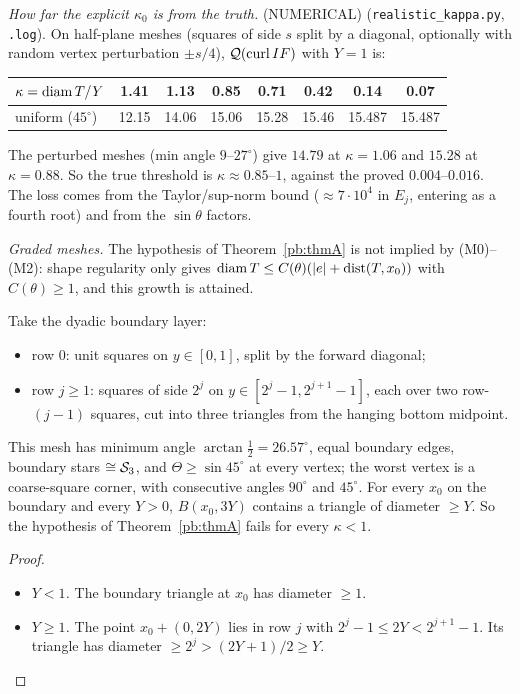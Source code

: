 \emph{How far the explicit $\kappa_0$ is from the truth.} (NUMERICAL) (\texttt{realistic\_kappa.py}, \texttt{.log}). On half-plane meshes (squares of side $s$ split by a
diagonal, optionally with random vertex perturbation $\pm s/4$), $\mathcal Q(\operatorname{curl} IF)$ with $Y=1$ is:
\begin{center}\small\begin{tabular}{lccccccc}
\toprule
$\kappa=\operatorname{diam} T/Y$ & 1.41 & 1.13 & 0.85 & 0.71 & 0.42 & 0.14 & 0.07\\
\midrule
uniform ($45^\circ$) & 12.15 & 14.06 & 15.06 & 15.28 & 15.46 & 15.487 & 15.487\\
\bottomrule
\end{tabular}\end{center}
The perturbed meshes (min angle $9$--$27^\circ$) give $14.79$ at $\kappa=1.06$ and $15.28$ at $\kappa=0.88$. So the true
threshold is $\kappa\approx0.85$--$1$, against the proved $0.004$--$0.016$. The loss comes from the Taylor/sup-norm bound
($\approx7\cdot10^4$ in $E_j$, entering as a fourth root) and from the $\sin\theta$ factors.


\emph{Graded meshes.} The hypothesis of Theorem~\ref{pb:thmA} is not implied by (M0)--(M2): shape regularity only gives $\operatorname{diam} T\le C(\theta)(|e|+\operatorname{dist}(T,x_0))$ with $C(\theta)\ge1$, and this growth is attained.

\begin{proposition}\label{pb:obst}
Take the dyadic boundary layer:
\begin{itemize}
\item row 0: unit squares on $y\in[0,1]$, split by the forward diagonal;
\item row $j\ge1$: squares of side $2^j$ on $y\in[2^j-1,2^{j+1}-1]$, each over two row-$(j-1)$ squares, cut into three
triangles from the hanging bottom midpoint.
\end{itemize}
This mesh has minimum angle $\arctan\frac12=26.57^\circ$, equal boundary edges, boundary stars $\cong\mathcal S_3$, and
$\Theta\ge\sin45^\circ$ at every vertex; the worst vertex is a coarse-square corner, with consecutive angles $90^\circ$ and
$45^\circ$. For every $x_0$ on the boundary and every $Y>0$, $B(x_0,3Y)$ contains a triangle of diameter $\ge Y$. So the hypothesis of Theorem~\ref{pb:thmA} fails for every $\kappa<1$.
\end{proposition}
\begin{proof}
\begin{itemize}
\item \emph{$Y<1$.} The boundary triangle at $x_0$ has diameter $\ge1$.
\item \emph{$Y\ge1$.} The point $x_0+(0,2Y)$ lies in row $j$ with $2^j-1\le2Y<2^{j+1}-1$. Its triangle has diameter
$\ge2^j>(2Y+1)/2\ge Y$.\qedhere
\end{itemize}
\end{proof}

